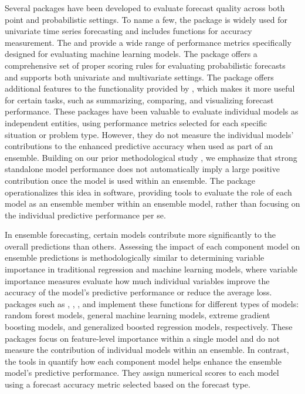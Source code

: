\documentclass[
  article,
  shortnames,
  notitle]{jss}
\begin{document}
Several  packages have been developed to evaluate forecast
quality across both point and probabilistic settings. To name a few, the
 package \citep{Rpackage-fable} is widely used for univariate
time series forecasting and includes functions for accuracy measurement.
The  \citep{Rpackage-Metrics} and 
\citep{Rpackage-MLmetrics} provide a wide range of performance metrics
specifically designed for evaluating machine learning models. The
 \citep{Rpackage-scoringRules} package offers a
comprehensive set of proper scoring rules for evaluating probabilistic
forecasts and supports both univariate and multivariate settings. The
 \citep{bosse2022evaluating} package offers additional
features to the functionality provided by , which
makes it more useful for certain tasks, such as summarizing, comparing,
and visualizing forecast performance. These packages have been valuable
to evaluate individual models as independent entities, using performance
metrics selected for each specific situation or problem type. However,
they do not measure the individual models' contributions to the enhanced
predictive accuracy when used as part of an ensemble. Building on our
prior methodological study \citep{kim2026beyond}, we emphasize that
strong standalone model performance does not automatically imply a large
positive contribution once the model is used within an ensemble. The
 package operationalizes this idea in software,
providing tools to evaluate the role of each model as an ensemble member
within an ensemble model, rather than focusing on the individual
predictive performance per se.

In ensemble forecasting, certain models contribute more significantly to
the overall predictions than others. Assessing the impact of each
component model on ensemble predictions is methodologically similar to
determining variable importance in traditional regression and machine
learning models, where variable importance measures evaluate how much
individual variables improve the accuracy of the model's predictive
performance or reduce the average loss.  packages such as
 \citep{Rpackage-randomForest}, 
\citep{Rpackage-caret},  \citep{Rpackage-xgboost}, and
 \citep{Rpackage-gbm} implement these functions for different
types of models: random forest models, general machine learning models,
extreme gradient boosting models, and generalized boosted regression
models, respectively. These packages focus on feature-level importance
within a single model and do not measure the contribution of individual
models within an ensemble. In contrast, the tools in
 quantify how each component model helps enhance
the ensemble model's predictive performance. They assign numerical
scores to each model using a forecast accuracy metric selected based on
the forecast type.
\end{document}
